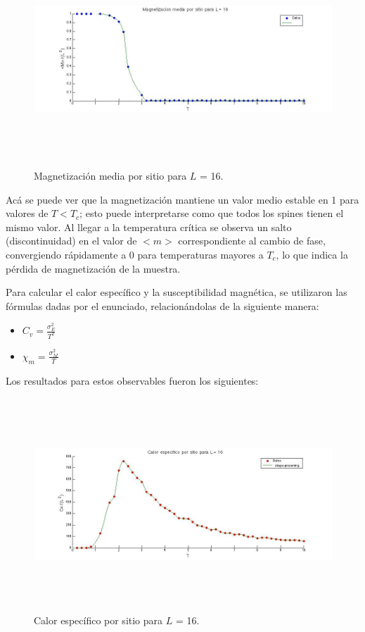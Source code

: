 \documentclass[a4paper,12pt]{article}
\begin{document}
\begin{figure}[H]
\begin{center}
\includegraphics[height=8cm]{../graficos/Mmean_L16.jpg}
\caption[width=5cm]{Magnetizaci\'on media por sitio para $L$ = 16.}
\end{center}
\end{figure}

Ac\'a se puede ver que la magnetizaci\'on mantiene un valor medio estable en 1 para valores de $T < T_{c}$; esto puede interpretarse como que todos los spines tienen el mismo valor. Al llegar a la temperatura cr\'itica se observa un salto (discontinuidad) en el valor de $<m>$ correspondiente al cambio de fase, convergiendo r\'apidamente a 0 para temperaturas mayores a $T_{c}$, lo que indica la p\'erdida de magnetizaci\'on de la muestra.


Para calcular el calor espec\'ifico y la susceptibilidad magn\'etica, se utilizaron las f\'ormulas dadas por el enunciado, relacion\'andolas de la siguiente manera:

\begin{itemize}
\item $C_{v} = \frac{\sigma_{E}^{2}}{T^2}$ 
\item $\chi_{m} = \frac{\sigma_{M}^{2}}{T}$ 
\end{itemize}

Los resultados para estos observables fueron los siguientes:

\begin{figure}[H]
\begin{center}
\includegraphics[height=8cm]{../graficos/Cv_L16.jpg}
\caption[width=5cm]{Calor espec\'ifico por sitio para $L$ = 16.}
\end{center}
\end{figure}
\end{document}
